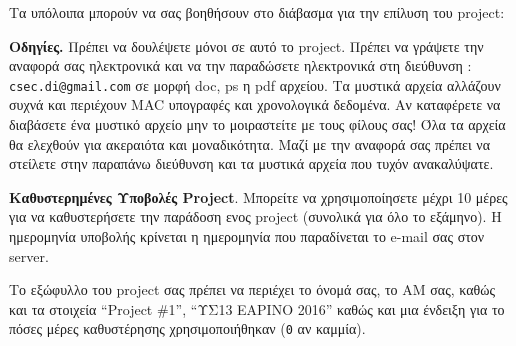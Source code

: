 \documentclass[11pt,a4paper]{article}
\begin{document}
Τα υπόλοιπα μπορούν να σας βοηθήσουν στο διάβασμα για την 
επίλυση του project:
{\small
{}
}


\noindent
{\bf Οδηγίες.}
Πρέπει να δουλέψετε μόνοι σε αυτό το project. 
Πρέπει να γράψετε την αναφορά σας ηλεκτρονικά και να την 
παραδώσετε  ηλεκτρονικά στη διεύθυνση : 
{\tt csec.di@gmail.com} σε μορφή doc, ps η pdf αρχείου.
Τα μυστικά αρχεία αλλάζουν συχνά και περιέχουν 
 MAC υπογραφές και χρονολογικά δεδομένα. 
Αν καταφέρετε να διαβάσετε ένα μυστικό αρχείο μην 
το μοιραστείτε με τους φίλους σας! Όλα τα αρχεία
θα ελεχθούν για ακεραιότα και μοναδικότητα.
Μαζί με την αναφορά σας πρέπει να στείλετε στην παραπάνω διεύθυνση
και  τα μυστικά αρχεία που τυχόν ανακαλύψατε. 

\noindent
{\bf Καθυστερημένες Υποβολές Project}. Μπορείτε να χρησιμοποίησετε μέχρι
10 μέρες για να καθυστερήσετε την παράδοση ενος project (συνολικά
για όλο το εξάμηνο). Η ημερομηνία υποβολής κρίνεται η ημερομηνία
που παραδίνεται το e-mail σας στον server. 

Το εξώφυλλο του project σας πρέπει να 
περιέχει το όνομά σας, το ΑΜ σας, καθώς και τα στοιχεία ``Project \#1'', 
``ΥΣ13 ΕΑΡΙΝΟ 2016'' καθώς και μια ένδειξη για το πόσες
μέρες καθυστέρησης χρησιμοποιήθηκαν 
 ({\tt 0} αν καμμία).
\end{document}

